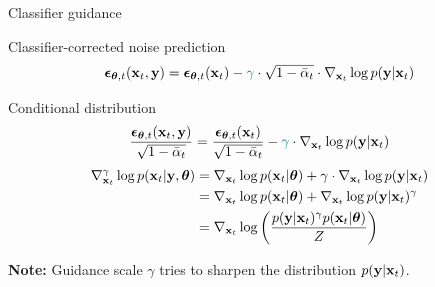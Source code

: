 \begin{frame}{Classifier guidance}
	\begin{block}{Classifier-corrected noise prediction}
		\vspace{-0.3cm}
		\[
			\boldsymbol{\epsilon}_{\boldsymbol{\theta}, t}(\mathbf{x}_t, \mathbf{y}) = \boldsymbol{\epsilon}_{\boldsymbol{\theta}, t}(\mathbf{x}_t) - {\color{teal}\gamma} \cdot \sqrt{1 - \bar{\alpha}_t} \cdot \nabla_{\mathbf{x}_t} \log p(\mathbf{y} | \mathbf{x}_t)
		\]
		\vspace{-0.7cm}
	\end{block}
	\begin{block}{Conditional distribution}
		\[
			\frac{\boldsymbol{\epsilon}_{\boldsymbol{\theta}, t}(\mathbf{x}_t, \mathbf{y})}{\sqrt{1 - \bar{\alpha}_t}} = \frac{\boldsymbol{\epsilon}_{\boldsymbol{\theta}, t}(\mathbf{x}_t)}{\sqrt{1 - \bar{\alpha}_t}} - {\color{teal}\gamma} \cdot \nabla_{\mathbf{x}_t} \log p(\mathbf{y} | \mathbf{x}_t)
		\]
		\vspace{-0.5cm}
		\begin{align*}
			\nabla_{\mathbf{x}_t}^{\gamma} \log p(\mathbf{x}_t | \mathbf{y}, \boldsymbol{\theta}) &= \nabla_{\mathbf{x}_t} \log p(\mathbf{x}_t | \boldsymbol{\theta}) + \gamma \cdot \nabla_{\mathbf{x}_t} \log p(\mathbf{y} | \mathbf{x}_t) \\
			&= \nabla_{\mathbf{x}_t} \log p(\mathbf{x}_t | \boldsymbol{\theta}) + \nabla_{\mathbf{x}_t} \log p(\mathbf{y} | \mathbf{x}_t)^{\gamma} \\
			&= \nabla_{\mathbf{x}_t} \log \left( \frac{p(\mathbf{y} | \mathbf{x}_t)^{\gamma} p(\mathbf{x}_t | \boldsymbol{\theta})}{Z} \right)
		\end{align*}
		\vspace{-0.5cm}
	\end{block}
	\textbf{Note:} Guidance scale $\gamma$ tries to sharpen the distribution $p(\mathbf{y} | \mathbf{x}_t)$.
\end{frame}
